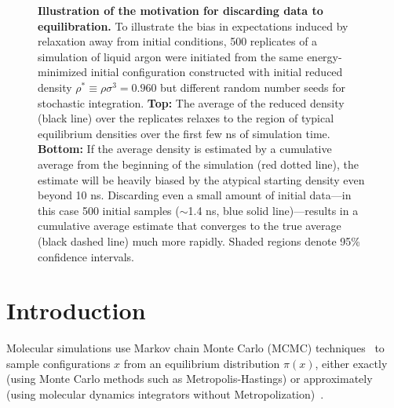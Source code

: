 \documentclass[aps,pre,twocolumn,nofootinbib,superscriptaddress,linenumbers,11point]{revtex4-1}
\begin{document}
\begin{figure}[tbp]
\caption{\label{figure:burn-in-example} {\bf Illustration of the motivation for discarding data to equilibration.} 
To illustrate the bias in expectations induced by relaxation away from initial conditions, 500 replicates of a simulation of liquid argon were initiated from the same energy-minimized initial configuration constructed with initial reduced density $\rho^* \equiv \rho \sigma^3 = 0.960$ but different random number seeds for stochastic integration.
%
{\bf Top:} The average of the reduced density (black line) over the replicates relaxes to the region of typical equilibrium densities over the first few ns of simulation time.
%
{\bf Bottom:} If the average density is estimated by a cumulative average from the beginning of the simulation (red dotted line), the estimate will be heavily biased by the atypical starting density even beyond 10 ns.
Discarding even a small amount of initial data---in this case 500 initial samples ($\sim$1.4 ns, blue solid line)---results in a cumulative average estimate that converges to the true average (black dashed line) much more rapidly.
% 
Shaded regions denote 95\% confidence intervals.
}
\end{figure}


\section*{Introduction}
\label{section:introduction}

Molecular simulations use Markov chain Monte Carlo (MCMC) techniques~\cite{jun-s-liu:mcmc} to sample configurations $x$ from an equilibrium distribution $\pi(x)$, either exactly (using Monte Carlo methods such as Metropolis-Hastings) or approximately (using molecular dynamics integrators without Metropolization)~\cite{sivak:2013:prx:vvvr}.
\end{document}
